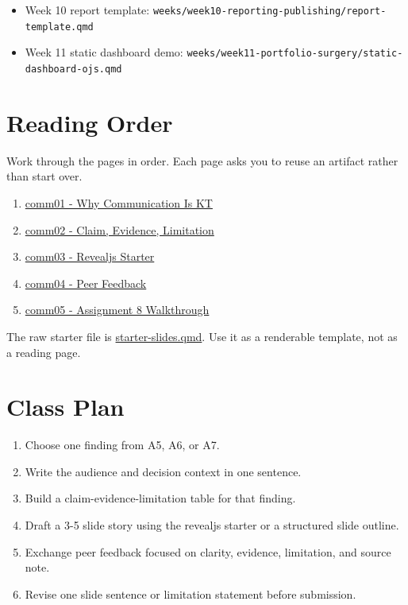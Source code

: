 \documentclass[
  letterpaper,
  DIV=11,
  numbers=noendperiod,
  oneside]{scrreprt}
\providecommand{\tightlist}{%
  \setlength{\itemsep}{0pt}\setlength{\parskip}{0pt}}
\begin{document}
\begin{itemize}
\tightlist
\item
  Week 10 report template:
  \texttt{weeks/week10-reporting-publishing/report-template.qmd}
\item
  Week 11 static dashboard demo:
  \texttt{weeks/week11-portfolio-surgery/static-dashboard-ojs.qmd}
\end{itemize}

\section*{Reading Order}\label{reading-order-3}


Work through the pages in order. Each page asks you to reuse an artifact
rather than start over.

\begin{enumerate}
\def\labelenumi{\arabic{enumi}.}
\tightlist
\item
  \href{comm01-overview-and-goals.qmd}{comm01 - Why Communication Is KT}
\item
  \href{comm02-claim-evidence-limitation.qmd}{comm02 - Claim, Evidence,
  Limitation}
\item
  \href{comm03-revealjs-starter.qmd}{comm03 - Revealjs Starter}
\item
  \href{comm04-peer-feedback.qmd}{comm04 - Peer Feedback}
\item
  \href{comm05-assignment-a8-and-reference.qmd}{comm05 - Assignment 8
  Walkthrough}
\end{enumerate}

The raw starter file is \url{starter-slides.qmd}. Use it as a renderable
template, not as a reading page.

\section*{Class Plan}\label{class-plan-3}


\begin{enumerate}
\def\labelenumi{\arabic{enumi}.}
\tightlist
\item
  Choose one finding from A5, A6, or A7.
\item
  Write the audience and decision context in one sentence.
\item
  Build a claim-evidence-limitation table for that finding.
\item
  Draft a 3-5 slide story using the revealjs starter or a structured
  slide outline.
\item
  Exchange peer feedback focused on clarity, evidence, limitation, and
  source note.
\item
  Revise one slide sentence or limitation statement before submission.
\end{enumerate}
\end{document}
